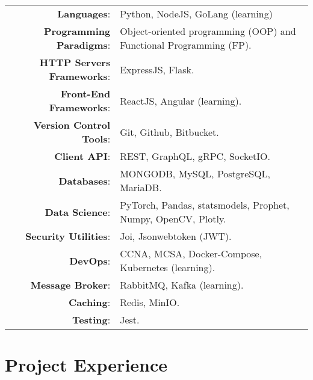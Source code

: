 \documentclass[a4paper,10pt]{article}
\begin{document}
\begin{tabular}{rl}	
    \textbf{Languages}:& Python, NodeJS, GoLang (learning)\\
    \textbf{Programming Paradigms}:&  Object-oriented programming (OOP) and Functional Programming (FP).\\
    \textbf{HTTP Servers Frameworks}:& ExpressJS, Flask.\\
    \textbf{Front-End Frameworks}:& ReactJS, Angular (learning).\\
    \textbf{Version Control Tools}:& Git, Github, Bitbucket.\\
    \textbf{Client API}:& REST, GraphQL, gRPC, SocketIO.\\
    \textbf{Databases}:& MONGODB, MySQL, PostgreSQL, MariaDB.\\
    \textbf{Data Science}:& PyTorch, Pandas, statsmodels, Prophet, Numpy, OpenCV, Plotly.\\
    \textbf{Security Utilities}:& Joi, Jsonwebtoken (JWT).\\ 
    \textbf{DevOps}:& CCNA, MCSA, Docker-Compose, Kubernetes (learning).\\
    \textbf{Message Broker}:& RabbitMQ, Kafka (learning).\\
    \textbf{Caching}:& Redis, MinIO.\\
    \textbf{Testing}:& Jest.\\ 
\end{tabular}

 
\section{\textbf{Project Experience}}  
\end{document}
